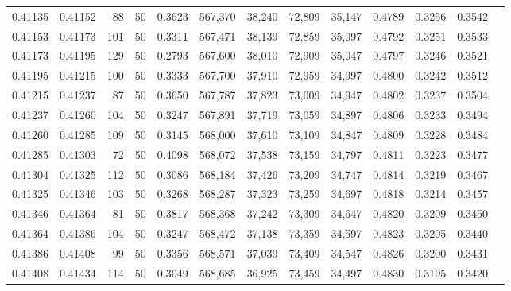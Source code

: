 \begin{tabular}{rrrrrrrrrrrrr}
0.41135 & 0.41152 &    88 &  50 &                                     0.3623 & 567,370 &  38,240 &  72,809 &  35,147 & 0.4789 & 0.3256 & 0.3542 \\
0.41153 & 0.41173 &   101 &  50 &                                     0.3311 & 567,471 &  38,139 &  72,859 &  35,097 & 0.4792 & 0.3251 & 0.3533 \\
0.41173 & 0.41195 &   129 &  50 &                                     0.2793 & 567,600 &  38,010 &  72,909 &  35,047 & 0.4797 & 0.3246 & 0.3521 \\
0.41195 & 0.41215 &   100 &  50 &                                     0.3333 & 567,700 &  37,910 &  72,959 &  34,997 & 0.4800 & 0.3242 & 0.3512 \\
0.41215 & 0.41237 &    87 &  50 &                                     0.3650 & 567,787 &  37,823 &  73,009 &  34,947 & 0.4802 & 0.3237 & 0.3504 \\
0.41237 & 0.41260 &   104 &  50 &                                     0.3247 & 567,891 &  37,719 &  73,059 &  34,897 & 0.4806 & 0.3233 & 0.3494 \\
0.41260 & 0.41285 &   109 &  50 &                                     0.3145 & 568,000 &  37,610 &  73,109 &  34,847 & 0.4809 & 0.3228 & 0.3484 \\
0.41285 & 0.41303 &    72 &  50 &                                     0.4098 & 568,072 &  37,538 &  73,159 &  34,797 & 0.4811 & 0.3223 & 0.3477 \\
0.41304 & 0.41325 &   112 &  50 &                                     0.3086 & 568,184 &  37,426 &  73,209 &  34,747 & 0.4814 & 0.3219 & 0.3467 \\
0.41325 & 0.41346 &   103 &  50 &                                     0.3268 & 568,287 &  37,323 &  73,259 &  34,697 & 0.4818 & 0.3214 & 0.3457 \\
0.41346 & 0.41364 &    81 &  50 &                                     0.3817 & 568,368 &  37,242 &  73,309 &  34,647 & 0.4820 & 0.3209 & 0.3450 \\
0.41364 & 0.41386 &   104 &  50 &                                     0.3247 & 568,472 &  37,138 &  73,359 &  34,597 & 0.4823 & 0.3205 & 0.3440 \\
0.41386 & 0.41408 &    99 &  50 &                                     0.3356 & 568,571 &  37,039 &  73,409 &  34,547 & 0.4826 & 0.3200 & 0.3431 \\
0.41408 & 0.41434 &   114 &  50 &                                     0.3049 & 568,685 &  36,925 &  73,459 &  34,497 & 0.4830 & 0.3195 & 0.3420 \\

\end{tabular}
